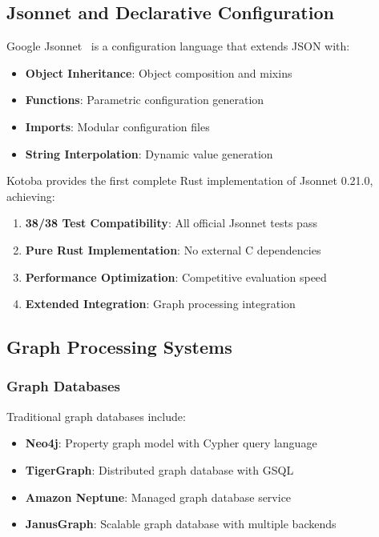 \documentclass[11pt,a4paper]{article}
\begin{document}
\subsection{Jsonnet and Declarative Configuration}
\label{subsec:jsonnet}

Google Jsonnet~\cite{jsonnet} is a configuration language that extends JSON with:
\begin{itemize}
\item \textbf{Object Inheritance}: Object composition and mixins
\item \textbf{Functions}: Parametric configuration generation
\item \textbf{Imports}: Modular configuration files
\item \textbf{String Interpolation}: Dynamic value generation
\end{itemize}

Kotoba provides the first complete Rust implementation of Jsonnet 0.21.0, achieving:
\begin{enumerate}
\item \textbf{38/38 Test Compatibility}: All official Jsonnet tests pass
\item \textbf{Pure Rust Implementation}: No external C dependencies
\item \textbf{Performance Optimization}: Competitive evaluation speed
\item \textbf{Extended Integration}: Graph processing integration
\end{enumerate}

\subsection{Graph Processing Systems}
\label{subsec:graph_systems}

\subsubsection{Graph Databases}
\label{subsubsec:graph_databases}

Traditional graph databases include:
\begin{itemize}
\item \textbf{Neo4j}: Property graph model with Cypher query language
\item \textbf{TigerGraph}: Distributed graph database with GSQL
\item \textbf{Amazon Neptune}: Managed graph database service
\item \textbf{JanusGraph}: Scalable graph database with multiple backends
\end{itemize}
\end{document}
